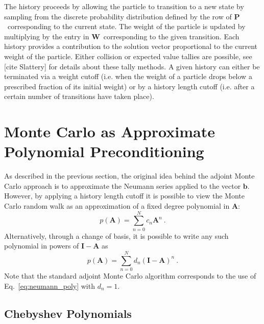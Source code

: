 \documentclass[10pt]{article}
\newcommand{\bb}{\ensuremath{\mathbf{b}}}
\newcommand{\bA}{\ensuremath{\mathbf{A}}}
\newcommand{\bP}{\ensuremath{\mathbf{P}}}
\newcommand{\bW}{\ensuremath{\mathbf{W}}}
\newcommand{\bI}{\ensuremath{\mathbf{I}}}
\begin{document}
The history proceeds by allowing the particle to transition
to a new state by sampling from the discrete probability distribution
defined by the row of \bP\ corresponding to the current state.
The weight of the particle is updated by multiplying by the
entry in \bW\ corresponding to the given transition.
Each history provides a contribution to the solution vector proportional
to the current weight of the particle.  Either collision or
expected value tallies are possible, see [cite Slattery] for details
about these tally methods.
A given history can either be terminated via a weight cutoff (i.e.
when the weight of a particle drops below a prescribed fraction
of its initial weight) or by a history length cutoff (i.e. after
a certain number of transitions have taken place).

\section{Monte Carlo as Approximate Polynomial Preconditioning}
\label{sec:polynomial_prec}

As described in the previous section, the original idea behind
the adjoint Monte Carlo approach is to approximate the
Neumann series applied to the vector \bb.
However, by applying a history length cutoff it is possible to
view the Monte Carlo random walk as an approximation of a
fixed degree polynomial in $\bA$:
\begin{equation}
p(\bA) = \sum_{n=0}^{N} c_n \bA^n \:. \label{eq:power_poly}
\end{equation}
Alternatively, through a change of basis, it is possible to write
any such polynomial in powers of $\bI - \bA$ as
\begin{equation}
p(\bA) = \sum_{n=0}^{N} d_n (\bI - \bA)^n \:. \label{eq:neumann_poly}
\end{equation}
Note that the standard adjoint Monte Carlo algorithm corresponds
to the use of Eq.~\eqref{eq:neumann_poly} with $d_n=1$.

\subsection{Chebyshev Polynomials}
\label{subsec:chebyshev}
\end{document}
